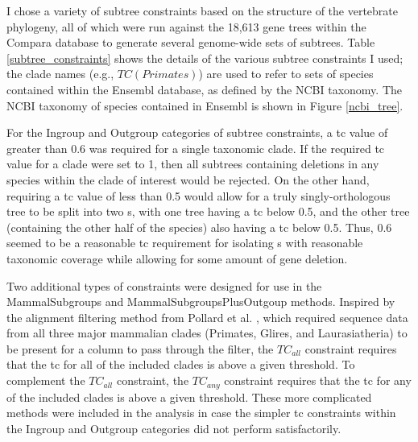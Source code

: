 I chose a variety of subtree constraints based on the structure of the
vertebrate phylogeny, all of which were run against the 18,613 gene
trees within the Compara database to generate several genome-wide sets
of subtrees. Table \ref{subtree_constraints} shows the details of the
various subtree constraints I used; the clade names (e.g.,
$TC(Primates)$) are used to refer to sets of species contained within
the Ensembl database, as defined by the NCBI taxonomy. The NCBI
taxonomy of species contained in Ensembl is shown in Figure
\ref{ncbi_tree}.

For the Ingroup and Outgroup categories of subtree constraints, a \ac{tc}
value of greater than 0.6 was required for a single taxonomic
clade. If the required \ac{tc} value for a clade were set to 1, then all
subtrees containing deletions in any species within the clade of
interest would be rejected. On the other hand, requiring a \ac{tc} value of
less than 0.5 would allow for a truly singly-orthologous tree to be
split into two \subtr{}s, with one tree having a \ac{tc} below 0.5, and the
other tree (containing the other half of the species) also having a \ac{tc}
below 0.5. Thus, 0.6 seemed to be a reasonable \ac{tc} requirement for
isolating \subtr{}s with reasonable taxonomic coverage while allowing
for some amount of gene deletion.

Two additional types of constraints were designed for use in the
MammalSubgroups and MammalSubgroupsPlusOutgoup methods. Inspired by
the alignment filtering method from Pollard et al. \citeyearpar{Pollard2010},
which required sequence data from all three major mammalian clades
(Primates, Glires, and Laurasiatheria) to be present for a column to
pass through the filter, the $TC_{all}$ constraint requires that the
\ac{tc} for all of the included clades is above a given threshold. To
complement the $TC_{all}$ constraint, the $TC_{any}$ constraint
requires that the \ac{tc} for any of the included clades is above a given
threshold. These more complicated methods were included in the
analysis in case the simpler \ac{tc} constraints within the Ingroup and
Outgroup categories did not perform satisfactorily.

